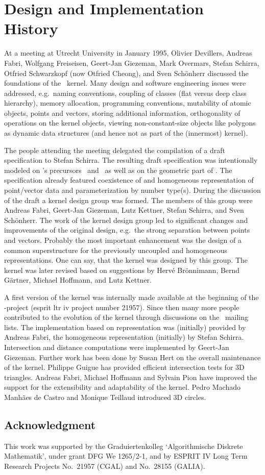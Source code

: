 \section{Design and Implementation History}

At a meeting at Utrecht University in January 1995,
Olivier Devillers, Andreas Fabri, Wolfgang Freiseisen,
Geert-Jan Giezeman, Mark Overmars, Stefan Schirra, Otfried Schwarzkopf
(now Otfried Cheong), and Sven Sch\"onherr
discussed the foundations of the \cgal\ kernel.
Many design and software engineering issues were addressed, 
e.g.\ naming conventions, coupling of classes 
(flat versus deep class hierarchy), 
memory allocation, programming conventions, mutability of 
atomic objects, points and vectors, storing additional information, 
orthogonality of operations on the kernel objects,
viewing non-constant-size objects like polygons as 
dynamic data structures (and hence not as part of the (innermost) kernel).

The people attending the meeting delegated the compilation of 
a draft specification to Stefan Schirra.
The resulting draft specification was intentionally modeled on \cgal's 
precursors \protocgal\ and \plageo\ as well as on the geometric part of \leda.
The specification already featured coexistence of 
 and 
homogeneous representation of point/vector data and parameterization 
by number type(s).
During the discussion of the draft a kernel design group was formed. 
The members of this group were Andreas Fabri, Geert-Jan Giezeman,
Lutz Kettner, Stefan Schirra, and Sven Sch\"onherr.
The work of the kernel design group led to significant changes and
improvements of the original design, e.g.\ the strong separation between
points and vectors. Probably the most important enhancement was the design 
of a common superstructure for the previously uncoupled 
 and
homogeneous representations. One can say, that the kernel was designed
by this group.
The kernel was later revised based on suggestions by Herv\'e Br\"onnimann,
Bernd G\"artner, Michael Hoffmann, and Lutz Kettner.

A first version of the kernel was internally made available at the beginning
of the \cgal-project ({\sc esprit ltr iv} project number 21957).
Since then many more people contributed to the evolution of the kernel
through discussions on the \cgal\ mailing lists.
The implementation based on 
 representation was (initially) provided 
by Andreas Fabri, the homogeneous representation (initially) by Stefan Schirra.
Intersection and distance computations were implemented by Geert-Jan Giezeman.
Further work has been done by Susan Hert on the overall maintenance of the
kernel.
Philippe Guigue has provided efficient intersection tests for 3D triangles.
Andreas Fabri, Michael Hoffmann and Sylvain Pion have improved the support for
the extensibility and adaptability of the kernel. Pedro Machado
Manh\~{a}es de Castro and Monique Teillaud introduced 3D circles. 

\subsection{Acknowledgment}

This work was supported
by the Graduiertenkolleg `Algorithmische Diskrete Mathematik',
under grant DFG We 1265/2-1,
and by ESPRIT IV Long Term Research Projects No.~21957 (CGAL)
and No.~28155 (GALIA).
